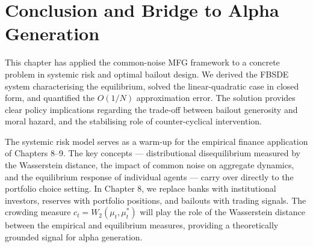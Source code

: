 \section{Conclusion and Bridge to Alpha Generation}
\label{sec:sr-conclusion}

This chapter has applied the common-noise MFG framework to a concrete problem in
systemic risk and optimal bailout design. We derived the FBSDE system
characterising the equilibrium, solved the linear-quadratic case in closed form, and
quantified the $O(1/N)$ approximation error. The solution provides clear policy
implications regarding the trade-off between bailout generosity and moral hazard,
and the stabilising role of counter-cyclical intervention.

The systemic risk model serves as a warm-up for the empirical finance application
of Chapters 8--9. The key concepts --- distributional disequilibrium measured by the
Wasserstein distance, the impact of common noise on aggregate dynamics, and the
equilibrium response of individual agents --- carry over directly to the portfolio
choice setting. In Chapter 8, we replace banks with institutional investors,
reserves with portfolio positions, and bailouts with trading signals. The crowding
measure $c_t = W_2(\mu_t, \mu_t^*)$ will play the role of the Wasserstein distance
between the empirical and equilibrium measures, providing a theoretically grounded
signal for alpha generation.
